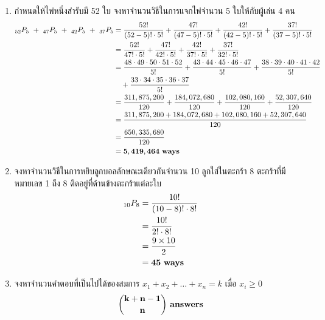 \documentclass{article}
\begin{document}
\begin{enumerate}
	\item กำหนดให้ไพ่หนึ่งสำรับมี 52 ใบ จงหาจำนวนวิธีในการแจกไพ่จำนวน 5 ใบให้กับผู้เล่น 4 คน
	\begin{equation}
	\begin{split}
	_{52}P_5 ~+~ _{47}P_5 ~+~ _{42}P_5 ~+~ _{37}P_5 &= \frac{52!}{(52 - 5)! \cdot 5!} + \frac{47!}{(47 - 5)! \cdot 5!} + \frac{42!}{(42 - 5)! \cdot 5!} + \frac{37!}{(37 - 5)! \cdot 5!}\notag \\
	&= \frac{52!}{47! \cdot 5!} + \frac{47!}{42! \cdot 5!} + \frac{42!}{37! \cdot 5!} + \frac{37!}{32! \cdot 5!} \\
	&= \frac{48 \cdot 49 \cdot 50 \cdot 51 \cdot 52}{5!} + \frac{43 \cdot 44 \cdot 45 \cdot 46 \cdot 47}{5!} + \frac{38 \cdot 39 \cdot 40 \cdot 41 \cdot 42}{5!} \\
	&~~~+ \frac{33 \cdot 34 \cdot 35 \cdot 36 \cdot 37}{5!} \\
	&= \frac{311,875,200}{120} + \frac{184,072,680}{120} + \frac{102,080,160}{120} + \frac{52,307,640}{120} \\
	&= \frac{311,875,200 + 184,072,680 + 102,080,160 + 52,307,640}{120} \\
	&= \frac{650,335,680}{120} \\
	&= \mathbf{5,419,464~ways}
	\end{split}
	\end{equation}
	
	\item จงหาจำนวนวิธีในการหยิบลูกบอลลักษณะเดียวกันจำนวน 10 ลูกใส่ในตะกร้า 8 ตะกร้าที่มีหมายเลข 1 ถึง 8\newline
	ติดอยู่ที่ด้านข้างตะกร้าแต่ละใบ
	\begin{equation}
	\begin{split}
	_{10}P_{8} &= \frac{10!}{(10 - 8)! \cdot 8!} \notag \\
	&= \frac{10!}{2! \cdot 8!} \\
	&= \frac{9 \times 10}{2} \\
	&= \mathbf{45~ways}
	\end{split}
	\end{equation}
	
	\item จงหาจำนวนคำตอบที่เป็นไปได้ของสมการ $x_1 + x_2 + \dots + x_n = k$ เมื่อ $x_i \geq 0$
	\begin{equation}
	\begin{split}
	 \mathbf{\binom{k + n - 1}{n}~answers} \notag \\
	\end{split}
	\end{equation}
	

\end{enumerate}
\end{document}

